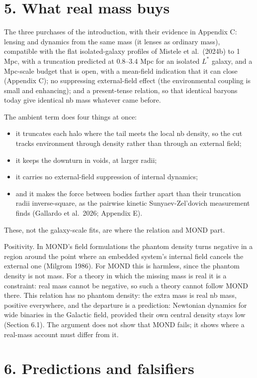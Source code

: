 \documentclass[
  10pt,
]{article}
\begin{document}
\section{5. What real mass buys}\label{what-real-mass-buys}

The three purchases of the introduction, with their evidence in Appendix
C: lensing and dynamics from the same mass (it lenses as ordinary mass),
compatible with the flat isolated-galaxy profiles of Mistele et al.~(2024b) to 1 Mpc, with a truncation predicted at 0.8--3.4 Mpc for an isolated $L^*$ galaxy, and a Mpc-scale budget that is open, with a mean-field indication that it can close (Appendix C);
no suppressing external-field effect (the environmental coupling is
small and enhancing); and a present-tense relation, so that identical baryons
today give identical nb mass whatever came before.

The ambient term does four things at once:
\begin{itemize}
\item it truncates each halo where the tail meets the local nb density, so the cut tracks environment through density rather than through an external field;
\item it keeps the downturn in voids, at larger radii;
\item it carries no external-field suppression of internal dynamics;
\item and it makes the force between bodies farther apart than their truncation radii inverse-square, as the pairwise kinetic Sunyaev-Zel'dovich measurement finds (Gallardo et al.~2026; Appendix E).
\end{itemize}
These, not the galaxy-scale fits, are where the
relation and MOND part.

Positivity. In MOND's field formulations the phantom density turns
negative in a region around the point where an embedded system's internal
field cancels the external one (Milgrom 1986). For MOND this is harmless,
since the phantom density is not mass. For a theory in which the missing
mass is real it is a constraint: real mass cannot be negative, so such a
theory cannot follow MOND there. This relation has no phantom density: the extra mass is real nb mass, positive everywhere, and the departure is a prediction: Newtonian dynamics for wide
binaries in the Galactic field, provided their own central density stays
low (Section 6.1). The argument does not show that
MOND fails; it shows where a real-mass account must differ from it.

\section{6. Predictions and falsifiers}\label{predictions-and-falsifiers}
\end{document}
